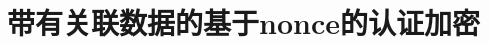 \section{带有关联数据的基于nonce的认证加密}\label{sec:9-5}

\begin{definition}\label{def:9-7}
	
\end{definition}

\begin{game}[密文完整性]\label{game:9-3}
	
\end{game}

\begin{definition}\label{def:9-8}
	
\end{definition}

\begin{definition}\label{def:9-9}
	
\end{definition}

\begin{theorem}\label{theo:9-4}
	
\end{theorem}